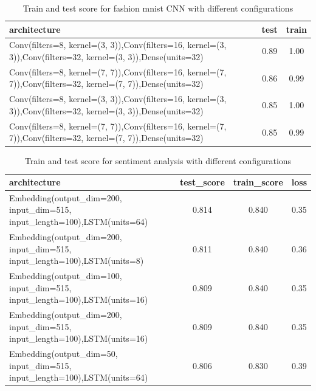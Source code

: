 \documentclass[10pt]{SelfArx} %
\begin{document}
	\begin{table}[]
		\begin{tabular*}{1\linewidth}{@{\extracolsep{\fill} }lcc@{}}
			\toprule
			architecture & test & train  \\ \midrule
			Conv(filters=8, kernel=(3, 3)),Conv(filters=16, kernel=(3, 3)),Conv(filters=32, kernel=(3, 3)),Dense(units=32) & 0.89 & 1.00 \\
			Conv(filters=8, kernel=(7, 7)),Conv(filters=16, kernel=(7, 7)),Conv(filters=32, kernel=(7, 7)),Dense(units=32) & 0.86 & 0.99 \\
			Conv(filters=8, kernel=(3, 3)),Conv(filters=16, kernel=(3, 3)),Conv(filters=32, kernel=(3, 3)),Dense(units=32) & 0.85 & 1.00  \\
			Conv(filters=8, kernel=(7, 7)),Conv(filters=16, kernel=(7, 7)),Conv(filters=32, kernel=(7, 7)),Dense(units=32) & 0.85 & 0.99  \\ \bottomrule
		\end{tabular*}
		\caption{Train and test score for fashion mnist CNN  with different configurations}
		\label{tfashion5}
	\end{table}
	
	\begin{table}[]
		\begin{tabular*}{1\linewidth}{@{\extracolsep{\fill} }lccc@{}}
			\toprule
			architecture & test\_score & train\_score & loss \\ \midrule
			Embedding(output\_dim=200, input\_dim=515, input\_length=100),LSTM(units=64) & 0.814 & 0.840 & 0.35 \\
			Embedding(output\_dim=200, input\_dim=515, input\_length=100),LSTM(units=8) & 0.811 & 0.840 & 0.36 \\
			Embedding(output\_dim=100, input\_dim=515, input\_length=100),LSTM(units=16) & 0.809 & 0.840 & 0.35 \\
			Embedding(output\_dim=200, input\_dim=515, input\_length=100),LSTM(units=16) & 0.809 & 0.840 & 0.35 \\
			Embedding(output\_dim=50, input\_dim=515, input\_length=100),LSTM(units=64) & 0.806 & 0.830 & 0.39 \\ \bottomrule
		\end{tabular*}
		\caption{Train and test score for sentiment analysis with different configurations}
		\label{tsentiment1}
	\end{table}
	
\end{document}
